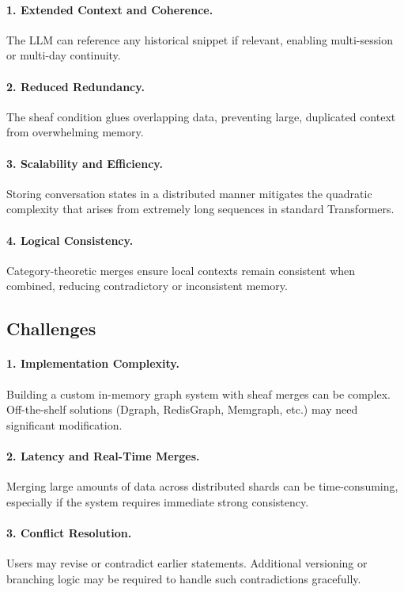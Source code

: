 \documentclass{article}
\begin{document}
\paragraph{1. Extended Context and Coherence.}
The LLM can reference any historical snippet if relevant, enabling multi-session or multi-day continuity.

\paragraph{2. Reduced Redundancy.}
The sheaf condition glues overlapping data, preventing large, duplicated context from overwhelming memory.

\paragraph{3. Scalability and Efficiency.}
Storing conversation states in a distributed manner mitigates the quadratic complexity that arises from extremely long sequences in standard Transformers.

\paragraph{4. Logical Consistency.}
Category-theoretic merges ensure local contexts remain consistent when combined, reducing contradictory or inconsistent memory.

\subsection{Challenges}

\paragraph{1. Implementation Complexity.}
Building a custom in-memory graph system with sheaf merges can be complex. Off-the-shelf solutions (Dgraph, RedisGraph, Memgraph, etc.) may need significant modification.

\paragraph{2. Latency and Real-Time Merges.}
Merging large amounts of data across distributed shards can be time-consuming, especially if the system requires immediate strong consistency.

\paragraph{3. Conflict Resolution.}
Users may revise or contradict earlier statements. Additional versioning or branching logic may be required to handle such contradictions gracefully.
\end{document}
